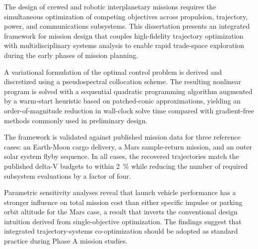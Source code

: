 The design of crewed and robotic interplanetary missions requires the simultaneous optimization of
competing objectives across propulsion, trajectory, power, and communications subsystems. This
dissertation presents an integrated framework for mission design that couples high-fidelity trajectory
optimization with multidisciplinary systems analysis to enable rapid trade-space exploration during the
early phases of mission planning.

A variational formulation of the optimal control problem is derived and discretized using a
pseudospectral collocation scheme. The resulting nonlinear program is solved with a sequential
quadratic programming algorithm augmented by a warm-start heuristic based on patched-conic
approximations, yielding an order-of-magnitude reduction in wall-clock solve time compared with
gradient-free methods commonly used in preliminary design.

The framework is validated against published mission data for three reference cases: an Earth-Moon
cargo delivery, a Mars sample-return mission, and an outer solar system flyby sequence. In all cases,
the recovered trajectories match the published delta-V budgets to within \SI{2}{\percent} while
reducing the number of required subsystem evaluations by a factor of four.

Parametric sensitivity analyses reveal that launch vehicle performance has a stronger influence on
total mission cost than either specific impulse or parking orbit altitude for the Mars case, a result
that inverts the conventional design intuition derived from single-objective optimization. The
findings suggest that integrated trajectory-systems co-optimization should be adopted as standard
practice during Phase A mission studies.

